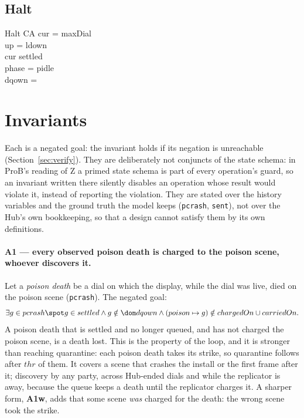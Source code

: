 \documentclass[a4paper,10pt,fleqn]{article}
\begin{document}
\subsection{Halt}

\begin{schema}{Halt}
  \Xi CA
\where
  cur = maxDial \\
  up = ldown \\
  cur \in settled \\
  phase = pidle \\
  dqown = \emptyset
\end{schema}

\section{Invariants}
\label{sec:inv}

Each is a negated goal: the invariant holds if its negation is unreachable
(Section~\ref{sec:verify}).  They are deliberately not conjuncts of the state
schema: in ProB's reading of Z a primed state schema is part of every
operation's guard, so an invariant written there silently disables an operation
whose result would violate it, instead of reporting the violation.  They are
stated over the history variables and the ground truth the model keeps
(\texttt{pcrash}, \texttt{sent}), not over the Hub's own bookkeeping, so that a
design cannot satisfy them by its own definitions.

\paragraph{A1 --- every observed poison death is charged to the poison scene,
whoever discovers it.}
Let a \emph{poison death} be a dial on which the display, while the dial was
live, died on the poison scene (\texttt{pcrash}).  The negated goal:
\[ \exists g \in pcrash \spot g \in settled \land g \notin \dom dqown \land
     (poison \mapsto g) \notin chargedOn \cup carriedOn. \]
A poison death that is settled and no longer queued, and has not charged the
poison scene, is a death lost.  This is the property of the loop, and it is
stronger than reaching quarantine: each poison death takes its strike, so
quarantine follows after $thr$ of them.  It covers a scene that crashes the
install or the first frame after it; discovery by any party, across Hub-ended
dials and while the replicator is away, because the queue keeps a death until
the replicator charges it.  A sharper form, \textbf{A1w}, adds that some scene
\emph{was} charged for the death: the wrong scene took the strike.
\end{document}
